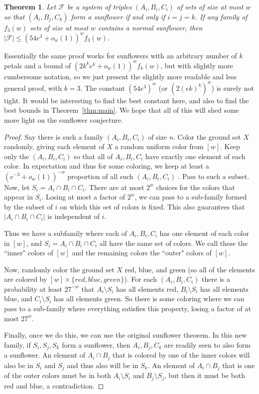 \documentclass[12pt]{article}
\newtheorem{theorem}{Theorem}[section]
\newcommand{\F}{\mathcal{F}}
\begin{document}
\begin{theorem}
	Let $\F$ be a system of triples $(A_i, B_i, C_i)$ of sets of size at most $w$ so that $(A_i, B_j, C_k)$ form a sunflower if and only if $i=j=k$.  If any family of $f_3(w)$ sets of size at most $w$ contains a normal sunflower, then $|\F| \le (54e^3+o_w(1))^wf_3(w)$.
\end{theorem}

Essentially the same proof works for sunflowers with an arbitrary number of $k$ petals and a bound of $(2k^ke^k+o_w(1))^wf_k(w)$, but with slightly more cumbersome notation, so we just present the slightly more readable and less general proof, with $k=3$.  The constant $(54e^3)^w$ (or $(2(ek)^k)^w$) is surely not tight.  It would be interesting to find the best constant here, and also to find the best bounds in Theorem~\ref{thm:main}. \iffalse and in Theorem~\ref{thm:furedi}.  \fi We hope that all of this will shed some more light on the sunflower conjecture.

\begin{proof}

Say there is such a family $(A_i, B_i,C_i)$ of size $n$.  Color the ground set $X$ randomly, giving each element of $X$ a random uniform color from $[w]$.  Keep only the $(A_i,B_i,C_i)$ so that all of $A_i, B_i, C_i$ have exactly one element of each color.  In expectation and thus for some coloring, we keep at least a $(e^{-3}+o_w(1))^{-w}$ proportion of all such $(A_i, B_i, C_i)$ .  Pass to such a subset.  Now, let $S_i=A_i \cap B_i \cap C_i$.  There are at most $2^w$ choices for the colors that appear in $S_i$.  Losing at most a factor of $2^w$, we can pass to a sub-family formed by the subset of $i$ on which this set of colors is fixed.  This also guarantees that $|A_i \cap B_i \cap C_i|$ is independent of $i$.

Thus we have a subfamily where each of $A_i, B_i, C_i$ has one element of each color in $[w]$, and $S_i=A_i \cap B_i \cap C_i$ all have the same set of colors.  We call these the ``inner" colors of $[w]$ and the remaining colors the ``outer" colors of $[w]$.

Now, randomly color the ground set $X$ red, blue, and green (so all of the elements are colored by $[w] \times \{red, blue, green\}$). For each $(A_i,B_i,C_i)$ there is a probability at least $27^{-w}$ that $A_i\setminus S_i$ has all elements red, $B_i\setminus S_i$ has all elements blue, and $C_i\setminus S_i$ has all elements green.  So there is some coloring where we can pass to a sub-family where everything satisfies this property, losing a factor of at most $27^w$.

Finally, once we do this, we can use the original sunflower theorem.  In this new family, if $S_i, S_j, S_k$ form a sunflower, then $A_i, B_j, C_k$ are readily seen to also form a sunflower.  An element of $A_i \cap B_j$ that is colored by one of the inner colors will also be in $S_i$ and $S_j$ and thus also will be in $S_k$.  An element of $A_i \cap B_j$ that is one of the outer colors must be in both $A_i \setminus S_i$ and $B_j \setminus S_j$, but then it must be both red and blue, a contradiction.\end{proof}
\end{document}
